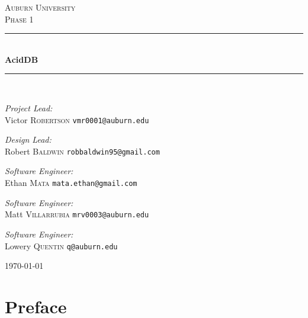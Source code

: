 \documentclass[a4paper]{report}
\newcommand{\HRule}{\rule{\linewidth}{0.5mm}}
\begin{document}
\begin{titlepage}
\begin{center}

\textsc{\LARGE Auburn University}\\[1.5cm]

\textsc{\Large Phase 1}\\[0.5cm]

\HRule \\[0.4cm]
{ \huge \bfseries AcidDB \\[0.4cm] }
\HRule \\[1.5cm]

\begin{minipage}{0.5\textwidth}
	\begin{flushleft} \large
		\emph{Project Lead:}\\
		Victor \textsc{Robertson} \texttt{vmr0001@auburn.edu}
	\end{flushleft}
	\begin{flushleft} \large
		\emph{Design Lead:}\\
		Robert \textsc{Baldwin} \texttt{robbaldwin95@gmail.com}
	\end{flushleft}
\end{minipage}
\begin{minipage}{0.3\textwidth}
	\begin{flushleft} \large
		\emph{Software Engineer:}\\
		Ethan \textsc{Mata} \texttt{mata.ethan@gmail.com}
	\end{flushleft}
	\begin{flushleft} \large
		\emph{Software Engineer:}\\
		Matt \textsc{Villarrubia} \texttt{mrv0003@auburn.edu}
	\end{flushleft}
	\begin{flushleft} \large
		\emph{Software Engineer:}\\
		Lowery \textsc{Quentin} \texttt{q@auburn.edu}
	\end{flushleft}
\end{minipage}

\vfill

{\large \today}

\end{center}
\end{titlepage}

\tableofcontents

\chapter{Preface}
\end{document}

